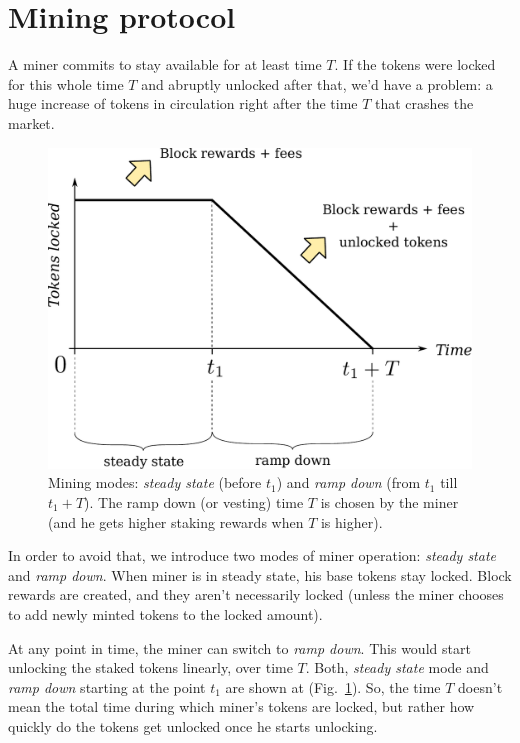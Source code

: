 \documentclass[longbibliography,nofootinbib,twocolumn]{revtex4-1}
\newcommand{\figref}[1]{Fig.~\ref{#1}}
\begin{document}
\section{Mining protocol}

A miner commits to stay available for at least time $T$.
If the tokens were locked for this whole time $T$ and abruptly unlocked after that, we'd have a problem:
a huge increase of tokens in circulation right after the time $T$ that crashes the market.

\begin{figure}
    \includegraphics[width=\columnwidth]{pdf/mining-modes.pdf}
    \caption{
        Mining modes: \emph{steady state} (before $t_1$) and \emph{ramp down} (from $t_1$ till $t_1 + T$).
        The ramp down (or vesting) time $T$ is chosen by the miner (and he gets higher staking rewards when $T$ is higher).
    }
    \label{fig:mining-modes}
\end{figure}

In order to avoid that, we introduce two modes of miner operation: \emph{steady state} and \emph{ramp down}.
When miner is in steady state, his base tokens stay locked.
Block rewards are created, and they aren't necessarily locked (unless the miner chooses to add newly minted tokens to the locked amount).

At any point in time, the miner can switch to \emph{ramp down}.
This would start unlocking the staked tokens linearly, over time $T$.
Both, \emph{steady state} mode and \emph{ramp down} starting at the point $t_1$ are shown at (\figref{fig:mining-modes}).
So, the time $T$ doesn't mean the total time during which miner's tokens are locked, but rather how quickly do the tokens get unlocked once he starts
unlocking.
\end{document}
